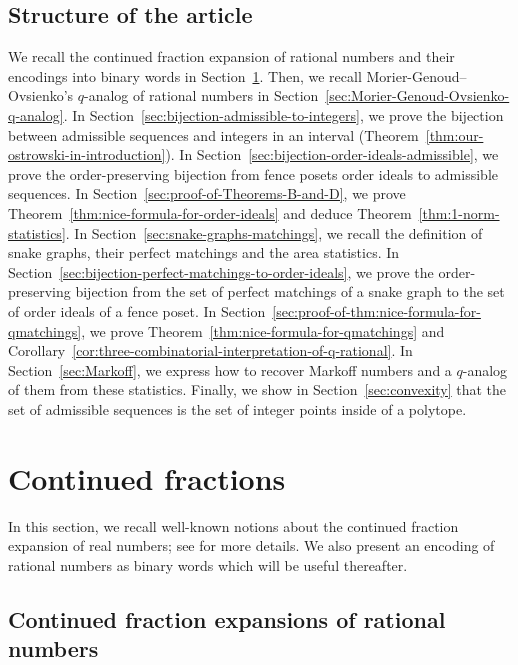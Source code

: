 \documentclass[a4paper,12pt]{amsart}
\newcommand{\0}{\mathtt{0}}
\newcommand{\1}{\mathtt{1}}
\newcommand{\2}{\mathtt{2}}
\newcommand{\3}{\mathtt{3}}
\begin{document}
\subsection*{Structure of the article}
We recall the continued fraction expansion of rational numbers
and their encodings into binary words in Section~\ref{sec:continued-fraction}.
Then, we recall Morier-Genoud--Ovsienko's $q$-analog of rational numbers 
in Section~\ref{sec:Morier-Genoud-Ovsienko-q-analog}.
In Section~\ref{sec:bijection-admissible-to-integers},
we prove the bijection between admissible sequences
and integers in an interval (Theorem~\ref{thm:our-ostrowski-in-introduction}).
In Section~\ref{sec:bijection-order-ideals-admissible},
we prove the order-preserving bijection from fence posets order ideals
to admissible sequences.
In Section~\ref{sec:proof-of-Theorems-B-and-D},
we prove Theorem~\ref{thm:nice-formula-for-order-ideals}
and deduce Theorem~\ref{thm:1-norm-statistics}.
In Section~\ref{sec:snake-graphs-matchings},
we recall the definition of snake graphs, their perfect matchings
and the area statistics.
In Section~\ref{sec:bijection-perfect-matchings-to-order-ideals},
we prove the order-preserving bijection from the set of perfect matchings of a snake graph to
the set of order ideals of a fence poset.
In Section~\ref{sec:proof-of-thm:nice-formula-for-qmatchings},
we prove Theorem~\ref{thm:nice-formula-for-qmatchings}
and Corollary~\ref{cor:three-combinatorial-interpretation-of-q-rational}.
In Section~\ref{sec:Markoff},
we express how to recover Markoff numbers and a $q$-analog of them
from these statistics.
Finally, we show in Section~\ref{sec:convexity} that
the set of admissible sequences is the set 
of integer points inside of a polytope.


\section{Continued fractions}
\label{sec:continued-fraction}

In this section, we recall well-known notions about the continued fraction
expansion of real numbers; see \cite{MR2445243} for more details.
We also present an encoding of rational numbers as binary words
which will be useful thereafter.

\subsection{Continued fraction expansions of rational numbers}
\end{document}
